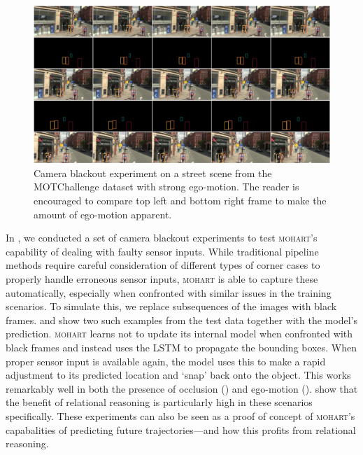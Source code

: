 \begin{figure}
	\centering
	\includegraphics[width=1.0\textwidth]{figures/MOHART/mot_example2.png}
	\vspace{-6mm}
	\caption{Camera blackout experiment on a street scene from the MOTChallenge dataset with strong ego-motion. The reader is encouraged to compare top left and bottom right frame to make the amount of ego-motion apparent.}
	\label{fig:blackout2}
\end{figure}


In , we conducted a set of camera blackout experiments to test \textsc{mohart}'s capability of dealing with faulty sensor inputs. While traditional pipeline methods require careful consideration of different types of corner cases to properly handle erroneous sensor inputs, \textsc{mohart} is able to capture these automatically, especially when confronted with similar issues in the training scenarios. To simulate this, we replace subsequences of the images with black frames.  and  show two such examples from the test data together with the model's prediction. \textsc{mohart} learns not to update its internal model when confronted with black frames and instead uses the LSTM to propagate the bounding boxes. When proper sensor input is available again, the model uses this to make a rapid adjustment to its predicted location and `snap' back onto the object. This works remarkably well in both the presence of occlusion () and ego-motion ().  show that the benefit of relational reasoning is particularly high in these scenarios specifically. These experiments can also be seen as a proof of concept of \textsc{mohart}'s capabalities of predicting future trajectories---and how this profits from relational reasoning.